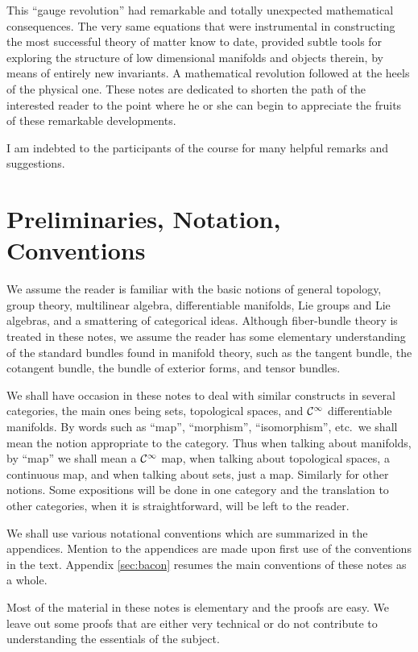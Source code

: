 \documentclass[12pt,titlepage]{article}
\def\cC{{\cal C}}
\begin{document}
This ``gauge revolution'' had remarkable and totally unexpected
mathematical consequences. The very same equations that were
instrumental in constructing the most successful theory of matter know
to date, provided subtle tools for exploring the structure of low
dimensional manifolds and objects therein, by means of entirely new
invariants. A mathematical revolution followed at the heels of the
physical one. These notes are dedicated to shorten the path of the
interested reader to the point where he or she can begin to appreciate
the fruits of these remarkable developments.

I am indebted to the participants of the course for many helpful remarks
and suggestions.



\section{Preliminaries, Notation, Conventions}\label{sec:prelim}

We assume the reader is familiar with the basic notions of general
topology, group theory, multilinear algebra, differentiable manifolds,
Lie groups and Lie algebras, and a smattering of categorical ideas.
Although fiber-bundle theory is treated in these notes, we assume the
reader has some elementary understanding of the standard bundles found
in manifold theory, such as the tangent bundle, the cotangent bundle,
the bundle of exterior forms, and tensor bundles.

We shall have occasion in these notes to deal with similar constructs in
several categories, the main ones being sets, topological spaces, and
\(\cC^\infty\) differentiable manifolds. By words such as ``map'',
``morphism'', ``isomorphism'', etc.\  we shall mean the 
notion appropriate to the
category. Thus when talking about manifolds, by ``map'' we shall mean a
\(\cC^\infty\) map, when talking about topological spaces, a continuous
map, and when talking about sets, just a map. Similarly for other
notions. Some expositions will be done in one category and the
translation to other categories, when it is straightforward, will be
left to the reader.

We shall use various notational conventions which are summarized in the
appendices. Mention to the appendices are made upon first use of the
conventions in the text. Appendix \ref{sec:bacon} resumes the main
conventions of these notes as a whole.

Most of the material in these notes is elementary and the proofs are
easy. We leave out some  proofs that are either very technical or do not
contribute to understanding the essentials of the subject. 
\end{document}
